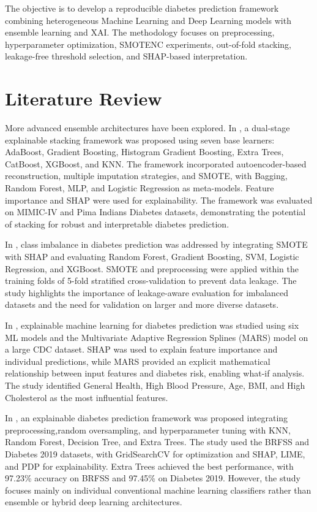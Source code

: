 \documentclass[conference]{IEEEtran}
\begin{document}
The objective is to develop a reproducible diabetes prediction framework combining heterogeneous Machine Learning and Deep Learning models with ensemble learning and XAI. The methodology focuses on preprocessing, hyperparameter optimization, SMOTENC experiments, out-of-fold stacking, leakage-free threshold selection, and SHAP-based interpretation.

\section{Literature Review}

More advanced ensemble architectures have been explored. In
\cite{ELGENDY2025126899}, a dual-stage explainable stacking framework was proposed using seven base learners: AdaBoost, Gradient Boosting, Histogram Gradient Boosting, Extra Trees, CatBoost, XGBoost, and KNN. The framework incorporated autoencoder-based reconstruction, multiple imputation strategies, and SMOTE, with Bagging, Random Forest, MLP, and Logistic Regression as meta-models. Feature importance and SHAP were used for explainability. The framework was evaluated on MIMIC-IV and Pima Indians Diabetes datasets, demonstrating the potential of stacking for robust and interpretable diabetes prediction.

In \cite{netayawijit2025}, class imbalance in diabetes prediction was addressed by integrating SMOTE with SHAP and evaluating Random Forest, Gradient Boosting, SVM, Logistic Regression, and XGBoost. SMOTE and preprocessing were applied within the training folds of 5-fold stratified cross-validation to prevent data leakage. The study highlights the importance of leakage-aware evaluation for imbalanced datasets and the need for validation on larger and more diverse datasets.

In \cite{PANG2025100390}, explainable machine learning for diabetes prediction was studied using six ML models and the Multivariate
Adaptive Regression Splines (MARS) model on a large CDC dataset. SHAP was used to explain feature importance and individual predictions, while MARS provided an explicit mathematical relationship between input features and diabetes risk, enabling what-if analysis. The study identified General Health, High Blood Pressure, Age, BMI, and High Cholesterol as the most influential features.

In \cite{islam2025}, an explainable diabetes prediction framework was proposed integrating preprocessing,random oversampling, and hyperparameter tuning with KNN, Random Forest, Decision Tree, and Extra Trees. The study used the BRFSS and Diabetes 2019 datasets, with GridSearchCV for optimization and SHAP, LIME, and PDP for explainability. Extra Trees achieved the best performance, with 97.23\% accuracy on BRFSS and 97.45\% on Diabetes 2019. However, the study focuses mainly on individual conventional machine learning classifiers rather than ensemble or hybrid deep learning architectures.
\end{document}
